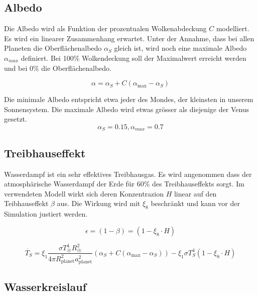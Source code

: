 \begin{refsection}
\subsection{Albedo}

Die Albedo wird als Funktion der prozentualen Wolkenabdeckung $C$ modelliert. Es wird ein linearer Zusammenhang erwartet. Unter der Annahme, dass bei allen Planeten die Oberflächenalbedo $\alpha_{S}$ gleich ist, wird noch eine maximale Albedo $\alpha_{max}$ definiert. Bei 100\% Wolkendeckung soll der Maximalwert erreicht werden und bei 0\% die Oberflächenalbedo.

\begin{equation}
\alpha = \alpha_S + C(\alpha_{\text{max}} - \alpha_S)
\end{equation}

Die minimale Albedo entspricht etwa jeder des Mondes, der kleinsten in unserem Sonnensystem. Die maximale Albedo wird etwas grösser als diejenige der Venus gesetzt.
\begin{equation}
\alpha_S = 0.15, \alpha_{max} = 0.7
\end{equation}

\subsection{Treibhauseffekt}

Wasserdampf ist ein sehr effektives Treibhausgas. Es wird angenommen dass der atmosphärische Wasserdampf der Erde für 60\% des Treibhauseffekts sorgt.  
Im verwendeten Modell wirkt sich deren Konzentrazion $H$ linear auf den Teibhauseffekt $\beta$ aus. Die Wirkung wird mit $\xi_8$ beschränkt und kann vor der Simulation justiert werden.

\begin{equation}
\epsilon  = (1 - \beta) = (1 - \xi_8 \cdot H)
\end{equation}

\begin{equation}
\dot{T_S} = \xi_1 \frac{\sigma T_{\astrosun}^4 R_{\astrosun}^2}{4 \pi R_{\text{planet}}^2 a_{\text{planet}}^2} (\alpha_S + C(\alpha_{\text{max}} - \alpha_S)) - \xi_1 \sigma T_{S}^4  (1 - \xi_8 \cdot H)
\end{equation}

\subsection{Wasserkreislauf}


\end{refsection}
